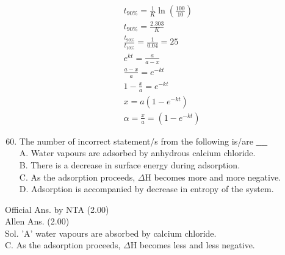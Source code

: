 \documentclass[10pt]{article}
\begin{document}
\[
\begin{aligned}
& t_{90 \%}=\frac{1}{K} \ln \left(\frac{100}{10}\right) \\
& t_{90 \%}=\frac{2.303}{K} \\
& \frac{t_{90 \%}}{t_{10 \%}}=\frac{1}{0.04}=25 \\
& e^{k t}=\frac{a}{a-x} \\
& \frac{a-x}{a}=e^{-k t} \\
& 1-\frac{x}{a}=e^{-k t} \\
& x=a\left(1-e^{-k t}\right) \\
& \alpha=\frac{x}{a}=\left(1-e^{-k t}\right)
\end{aligned}
\]

\begin{enumerate}
  \setcounter{enumi}{59}
  \item The number of incorrect statement/s from the following is/are \(\_\_\_\_\)\\
A. Water vapours are adsorbed by anhydrous calcium chloride.\\
B. There is a decrease in surface energy during adsorption.\\
C. As the adsorption proceeds, \(\Delta \mathrm{H}\) becomes more and more negative.\\
D. Adsorption is accompanied by decrease in entropy of the system.
\end{enumerate}

Official Ans. by NTA (2.00)\\
Allen Ans. (2.00)\\
Sol. 'A' water vapours are absorbed by calcium chloride.\\
C. As the adsorption proceeds, \(\Delta \mathrm{H}\) becomes less and less negative.
\end{document}
